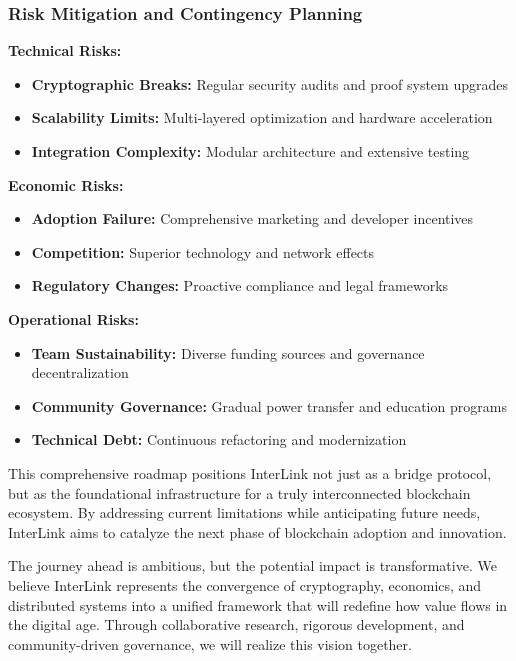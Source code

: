 \documentclass[11pt,a4paper]{article}
\begin{document}
\subsubsection{Risk Mitigation and Contingency Planning}

\textbf{Technical Risks:}
\begin{itemize}
    \item \textbf{Cryptographic Breaks:} Regular security audits and proof system upgrades
    \item \textbf{Scalability Limits:} Multi-layered optimization and hardware acceleration
    \item \textbf{Integration Complexity:} Modular architecture and extensive testing
\end{itemize}

\textbf{Economic Risks:}
\begin{itemize}
    \item \textbf{Adoption Failure:} Comprehensive marketing and developer incentives
    \item \textbf{Competition:} Superior technology and network effects
    \item \textbf{Regulatory Changes:} Proactive compliance and legal frameworks
\end{itemize}

\textbf{Operational Risks:}
\begin{itemize}
    \item \textbf{Team Sustainability:} Diverse funding sources and governance decentralization
    \item \textbf{Community Governance:} Gradual power transfer and education programs
    \item \textbf{Technical Debt:} Continuous refactoring and modernization
\end{itemize}

This comprehensive roadmap positions InterLink not just as a bridge protocol, but as the foundational infrastructure for a truly interconnected blockchain ecosystem. By addressing current limitations while anticipating future needs, InterLink aims to catalyze the next phase of blockchain adoption and innovation.

The journey ahead is ambitious, but the potential impact is transformative. We believe InterLink represents the convergence of cryptography, economics, and distributed systems into a unified framework that will redefine how value flows in the digital age. Through collaborative research, rigorous development, and community-driven governance, we will realize this vision together.
\end{document}

